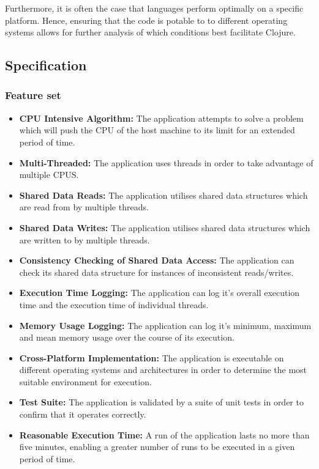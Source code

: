 \documentclass[12pt,a4paper]{article}
\begin{document}
Furthermore, it is often the case that languages perform optimally on a specific platform. Hence, ensuring that the code is potable to to different operating systems allows for further analysis of which conditions best facilitate Clojure.

\newpage
\subsection{Specification}

\subsubsection{Feature set}

\begin{itemize} \itemsep0pt
        \item \textbf{CPU Intensive Algorithm:} The application attempts to solve a problem which will push the CPU of the host machine to its limit for an extended period of time. 
        \item \textbf{Multi-Threaded:} The application uses threads in order to take advantage of multiple CPUS.
        \item \textbf{Shared Data Reads:} The application utilises shared data structures which are read from by multiple threads.
        \item \textbf{Shared Data Writes:} The application utilises shared data structures which are written to by multiple threads.
        \item \textbf{Consistency Checking of Shared Data Access:} The application can check its shared data structure for instances of inconsistent reads/writes.
        \item \textbf{Execution Time Logging:} The application can log it's overall execution time and the execution time of individual threads.
        \item \textbf{Memory Usage Logging:} The application can log it's minimum, maximum and mean memory usage over the course of its execution.
        \item \textbf{Cross-Platform Implementation:} The application is executable on different operating systems and architectures in order to determine the most suitable environment for execution.
        \item \textbf{Test Suite:} The application is validated by a suite of unit tests in order to confirm that it operates correctly.
        \item \textbf{Reasonable Execution Time:} A run of the application lasts no more than five minutes, enabling a greater number of runs to be executed in a given period of time.
\end{itemize}
\end{document}
